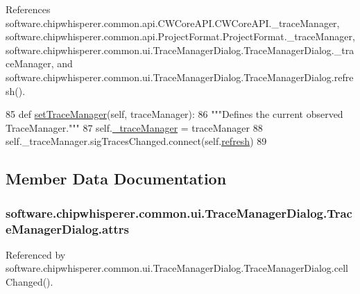 References software.\+chipwhisperer.\+common.\+api.\+C\+W\+Core\+A\+P\+I.\+C\+W\+Core\+A\+P\+I.\+\_\+trace\+Manager, software.\+chipwhisperer.\+common.\+api.\+Project\+Format.\+Project\+Format.\+\_\+trace\+Manager, software.\+chipwhisperer.\+common.\+ui.\+Trace\+Manager\+Dialog.\+Trace\+Manager\+Dialog.\+\_\+trace\+Manager, and software.\+chipwhisperer.\+common.\+ui.\+Trace\+Manager\+Dialog.\+Trace\+Manager\+Dialog.\+refresh().


\begin{DoxyCode}
85     \textcolor{keyword}{def }\hyperlink{classsoftware_1_1chipwhisperer_1_1common_1_1ui_1_1TraceManagerDialog_1_1TraceManagerDialog_ae1bfd8fa403fb510e21accde3eab3f74}{setTraceManager}(self, traceManager):
86         \textcolor{stringliteral}{"""Defines the current observed TraceManager."""}
87         self.\hyperlink{classsoftware_1_1chipwhisperer_1_1common_1_1ui_1_1TraceManagerDialog_1_1TraceManagerDialog_abab5abd71f4c2b825b2011d2d3bb8712}{\_traceManager} = traceManager
88         self.\_traceManager.sigTracesChanged.connect(self.\hyperlink{classsoftware_1_1chipwhisperer_1_1common_1_1ui_1_1TraceManagerDialog_1_1TraceManagerDialog_a5424cb507c1ef3b88ea8968a7852b05e}{refresh})
89 
\end{DoxyCode}


\subsection{Member Data Documentation}
\hypertarget{classsoftware_1_1chipwhisperer_1_1common_1_1ui_1_1TraceManagerDialog_1_1TraceManagerDialog_a5e77d358d04f1b0957d70e643390316e}{}
\subsubsection[{attrs}]{\setlength{\rightskip}{0pt plus 5cm}software.\+chipwhisperer.\+common.\+ui.\+Trace\+Manager\+Dialog.\+Trace\+Manager\+Dialog.\+attrs}\label{classsoftware_1_1chipwhisperer_1_1common_1_1ui_1_1TraceManagerDialog_1_1TraceManagerDialog_a5e77d358d04f1b0957d70e643390316e}


Referenced by software.\+chipwhisperer.\+common.\+ui.\+Trace\+Manager\+Dialog.\+Trace\+Manager\+Dialog.\+cell\+Changed().

